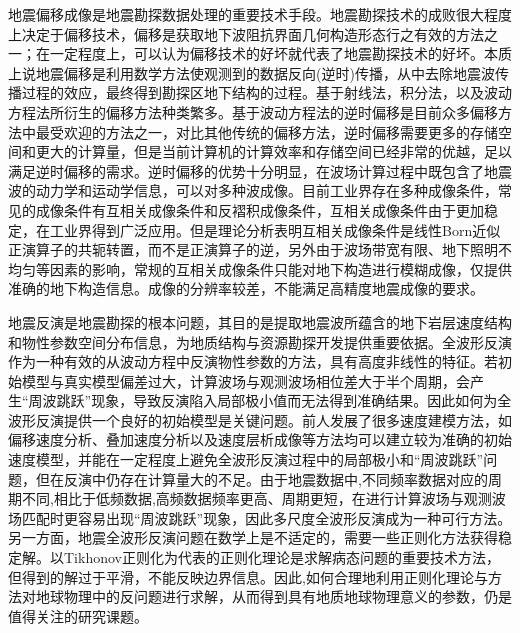 \documentclass[11pt]{article}
\begin{document}
地震偏移成像是地震勘探数据处理的重要技术手段。地震勘探技术的成败很大程度上决定于偏移技术，偏移是获取地下波阻抗界面几何构造形态行之有效的方法之一；在一定程度上，可以认为偏移技术的好坏就代表了地震勘探技术的好坏。本质上说地震偏移是利用数学方法使观测到的数据反向(逆时)传播，从中去除地震波传播过程的效应，最终得到勘探区地下结构的过程。基于射线法，积分法，以及波动方程法所衍生的偏移方法种类繁多。基于波动方程法的逆时偏移是目前众多偏移方法中最受欢迎的方法之一，对比其他传统的偏移方法，逆时偏移需要更多的存储空间和更大的计算量，但是当前计算机的计算效率和存储空间已经非常的优越，足以满足逆时偏移的需求。逆时偏移的优势十分明显，在波场计算过程中既包含了地震波的动力学和运动学信息，可以对多种波成像。目前工业界存在多种成像条件，常见的成像条件有互相关成像条件和反褶积成像条件，互相关成像条件由于更加稳定，在工业界得到广泛应用。但是理论分析表明互相关成像条件是线性Born近似正演算子的共轭转置，而不是正演算子的逆，另外由于波场带宽有限、地下照明不均匀等因素的影响，常规的互相关成像条件只能对地下构造进行模糊成像，仅提供准确的地下构造信息。成像的分辨率较差，不能满足高精度地震成像的要求。
\par
地震反演是地震勘探的根本问题，其目的是提取地震波所蕴含的地下岩层速度结构和物性参数空间分布信息，为地质结构与资源勘探开发提供重要依据。全波形反演作为一种有效的从波动方程中反演物性参数的方法，具有高度非线性的特征。若初始模型与真实模型偏差过大，计算波场与观测波场相位差大于半个周期，会产生``周波跳跃''现象，导致反演陷入局部极小值而无法得到准确结果。因此如何为全波形反演提供一个良好的初始模型是关键问题。前人发展了很多速度建模方法，如偏移速度分析、叠加速度分析以及速度层析成像等方法均可以建立较为准确的初始速度模型，并能在一定程度上避免全波形反演过程中的局部极小和``周波跳跃''问题，但在反演中仍存在计算量大的不足。由于地震数据中,不同频率数据对应的周期不同,相比于低频数据,高频数据频率更高、周期更短，在进行计算波场与观测波场匹配时更容易出现``周波跳跃''现象，因此多尺度全波形反演成为一种可行方法。另一方面，地震全波形反演问题在数学上是不适定的，需要一些正则化方法获得稳定解。以Tikhonov正则化为代表的正则化理论是求解病态问题的重要技术方法，但得到的解过于平滑，不能反映边界信息。因此,如何合理地利用正则化理论与方法对地球物理中的反问题进行求解，从而得到具有地质地球物理意义的参数，仍是值得关注的研究课题。
\par
\newpage
\end{document}
